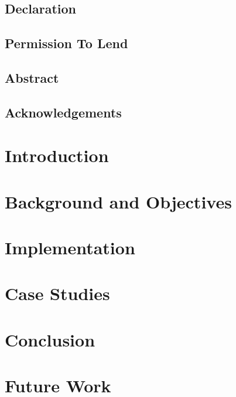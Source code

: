 \documentclass{report}
\begin{document}
	


	\section*{Declaration}
	
	\pagebreak

	\section*{Permission To Lend}
	
	\pagebreak

	\section*{Abstract}
	
	\pagebreak

	\section*{Acknowledgements}
	
	\pagebreak

	\tableofcontents
	\cleardoublepage

	\chapter{Introduction}
	

	\chapter{Background and Objectives}
	

	\chapter{Implementation}
	

	\chapter{Case Studies}
	

	\chapter{Conclusion}
	

	\chapter{Future Work}
	

	\clearpage
	\printbibliography
\end{document}
